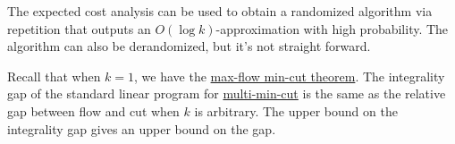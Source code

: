 The expected cost analysis can be used to obtain a randomized algorithm via repetition that outputs an \(O(\log k)\)-approximation with high probability. The algorithm can also be derandomized, but it's not straight forward.

\begin{remark}
	Recall that when \(k = 1\), we have the \hyperref[thm:max-flow-min-cut]{max-flow min-cut theorem}. The integrality gap of the standard linear program for \hyperref[prb:multi-min-cut]{multi-min-cut} is the same as the relative gap between flow and cut when \(k\) is arbitrary. The upper bound on the integrality gap gives an upper bound on the gap.
\end{remark}